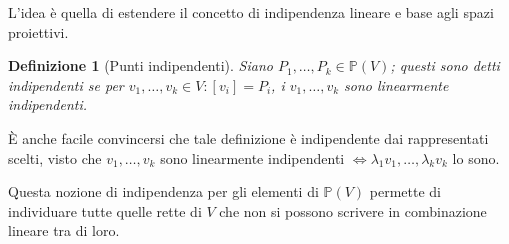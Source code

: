 \documentclass[12pt]{scrartcl}
\theoremstyle{style}
\newtheorem{definizione}{Definizione}[section]
\numberwithin{equation}{subsection}
\begin{document}
L'idea \`e quella di estendere il concetto di indipendenza lineare e base agli spazi proiettivi.

\begin{definizione}
	[Punti indipendenti]
	Siano $P_1, \ldots, P_k \in \mathbb{P}(V)$; questi sono detti \textit{indipendenti} se per $v_1,\ldots,v_k \in V : [v_i] = P_i$, i $v_1,\ldots,v_k$ sono linearmente indipendenti.
\end{definizione}
\noindent \`E anche facile convincersi che tale definizione \`e indipendente dai rappresentati scelti, visto che $v_1,\ldots,v_k$ sono linearmente indipendenti $\iff \lambda _1 v_1,\ldots, \lambda _kv_k$ lo sono.

Questa nozione di indipendenza per gli elementi di $\mathbb{P}(V)$ permette di individuare tutte quelle rette di $V$ che non si possono scrivere in combinazione lineare tra di loro.
\end{document}
